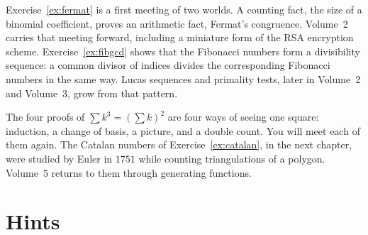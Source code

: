 \begin{beauty}
Exercise~\ref{ex:fermat} is a first meeting of two worlds. A counting fact, the size of a binomial coefficient, proves an arithmetic fact, Fermat's congruence. Volume~2 carries that meeting forward, including a miniature form of the RSA encryption scheme. Exercise~\ref{ex:fibgcd} shows that the Fibonacci numbers form a divisibility sequence: a common divisor of indices divides the corresponding Fibonacci numbers in the same way. Lucas sequences and primality tests, later in Volume~2 and Volume~3, grow from that pattern.

The four proofs of $\sum k^3=(\sum k)^2$ are four ways of seeing one square: induction, a change of basis, a picture, and a double count. You will meet each of them again. The Catalan numbers of Exercise~\ref{ex:catalan}, in the next chapter, were studied by Euler in $1751$ while counting triangulations of a polygon. Volume~5 returns to them through generating functions.
\end{beauty}

\section{Hints}

